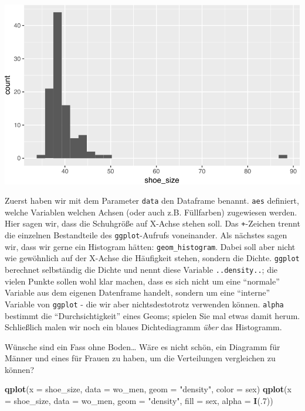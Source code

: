 \documentclass[12pt,ngerman,]{book}
\newenvironment{Shaded}{\begin{snugshade}}{\end{snugshade}}
\newcommand{\KeywordTok}[1]{\textcolor[rgb]{0.13,0.29,0.53}{\textbf{{#1}}}}
\newcommand{\DataTypeTok}[1]{\textcolor[rgb]{0.13,0.29,0.53}{{#1}}}
\newcommand{\DecValTok}[1]{\textcolor[rgb]{0.00,0.00,0.81}{{#1}}}
\newcommand{\StringTok}[1]{\textcolor[rgb]{0.31,0.60,0.02}{{#1}}}
\newcommand{\NormalTok}[1]{{#1}}
\renewenvironment{Shaded}{\begin{kframe}}{\end{kframe}}
\begin{document}
\begin{center}\includegraphics[width=0.7\linewidth]{050_Daten_visualisieren_files/figure-latex/unnamed-chunk-8-1} \end{center}

Zuerst haben wir mit dem Parameter \texttt{data} den Dataframe benannt.
\texttt{aes} definiert, welche Variablen welchen Achsen (oder auch z.B.
Füllfarben) zugewiesen werden. Hier sagen wir, dass die Schuhgröße auf
X-Achse stehen soll. Das \texttt{+}-Zeichen trennt die einzelnen
Bestandteile des \texttt{ggplot}-Aufrufs voneinander. Als nächstes sagen
wir, dass wir gerne ein Histogram hätten: \texttt{geom\_histogram}.
Dabei soll aber nicht wie gewöhnlich auf der X-Achse die Häufigkeit
stehen, sondern die Dichte. \texttt{ggplot} berechnet selbständig die
Dichte und nennt diese Variable \texttt{..density..}; die vielen Punkte
sollen wohl klar machen, dass es sich nicht um eine ``normale'' Variable
aus dem eigenen Datenframe handelt, sondern um eine ``interne'' Variable
von \texttt{ggplot} - die wir aber nichtsdestotrotz verwenden können.
\texttt{alpha} bestimmt die ``Durchsichtigkeit'' eines Geoms; spielen
Sie mal etwas damit herum. Schließlich malen wir noch ein blaues
Dichtediagramm \emph{über} das Histogramm.

Wünsche sind ein Fass ohne Boden\ldots{} Wäre es nicht schön, ein
Diagramm für Männer und eines für Frauen zu haben, um die Verteilungen
vergleichen zu können?

\begin{Shaded}
\begin{Highlighting}[]
\KeywordTok{qplot}\NormalTok{(}\DataTypeTok{x =} \NormalTok{shoe_size, }\DataTypeTok{data =} \NormalTok{wo_men, }\DataTypeTok{geom =} \StringTok{"density"}\NormalTok{, }\DataTypeTok{color =} \NormalTok{sex)}
\KeywordTok{qplot}\NormalTok{(}\DataTypeTok{x =} \NormalTok{shoe_size, }\DataTypeTok{data =} \NormalTok{wo_men, }\DataTypeTok{geom =} \StringTok{"density"}\NormalTok{, }\DataTypeTok{fill =} \NormalTok{sex, }\DataTypeTok{alpha =} \KeywordTok{I}\NormalTok{(.}\DecValTok{7}\NormalTok{))}
\end{Highlighting}
\end{Shaded}
\end{document}

